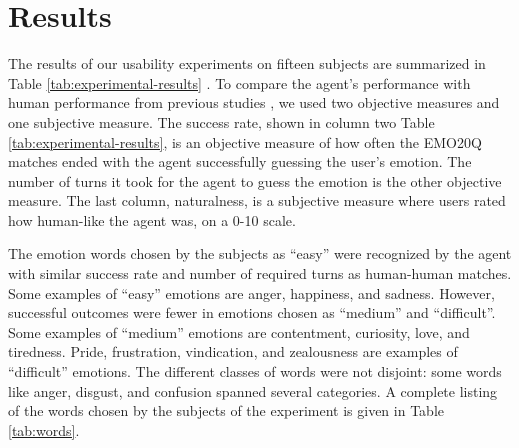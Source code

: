 \documentclass[a4paper]{article}
\begin{document}
%


\section{Results}
\label{sec:results}



The results of our usability experiments on fifteen subjects are summarized in
Table \ref{tab:experimental-results} .  To compare the agent's performance
with human performance from previous studies \cite{Kazemzadeh2011a}, we used
two objective measures and one subjective measure. The success rate, shown in
column two Table \ref{tab:experimental-results}, is an objective measure of
how often the EMO20Q matches ended with the agent successfully guessing the
user's emotion.  The number of turns it took for the agent to guess the
emotion is the other objective measure.  The last column, naturalness, is a
subjective measure where users rated how human-like the agent was, on a 0-10
scale.

The emotion words chosen by the subjects as ``easy'' were recognized by the
agent with similar success rate and number of required turns as human-human
matches.  Some examples of ``easy'' emotions are anger, happiness, and
sadness. However, successful outcomes were fewer in emotions chosen as
``medium'' and ``difficult''.  Some examples of ``medium'' emotions are
contentment, curiosity, love, and tiredness. Pride, frustration,
vindication, and zealousness are examples of ``difficult'' emotions. The
different classes of words were not disjoint: some words like anger, disgust,
and confusion spanned several categories. A complete listing of the words chosen by the subjects of the experiment is given in Table \ref{tab:words}. 
\end{document}
